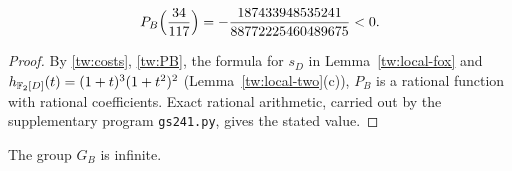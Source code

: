 \begin{lemma}\label{tw:PB-value}
\[
 P_B\Bigl(\frac{34}{117}\Bigr)=-\frac{187433948535241}{88772225460489675}<0.
\]
\end{lemma}

\begin{proof}
By \eqref{tw:costs}, \eqref{tw:PB}, the formula for $s_D$ in
Lemma~\ref{tw:local-fox} and $h_{\mathbb F_2[D]}(t)=(1+t)^3(1+t^2)^2$
(Lemma~\ref{tw:local-two}(c)), $P_B$ is a rational function with rational
coefficients. Exact rational arithmetic, carried out by the supplementary
program \texttt{gs241.py}, gives the stated value.
\end{proof}

\begin{proposition}\label{tw:infinite}
The group $G_B$ is infinite.
\end{proposition}


